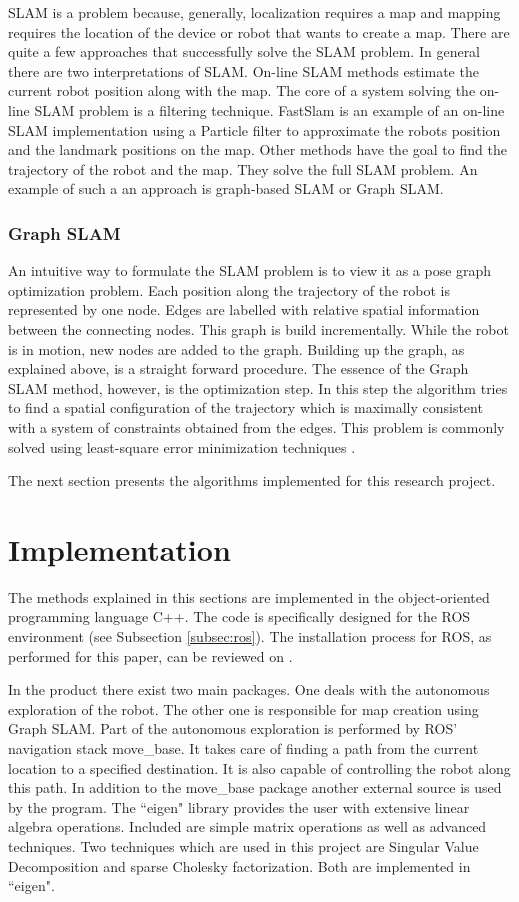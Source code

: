 \documentclass{ba-kecs}
\begin{document}
SLAM is a problem because, generally, localization requires a map and mapping requires the location of the device or robot that wants to create a map. There are quite a few approaches that successfully solve the SLAM problem. In general there are two interpretations of SLAM. On-line SLAM methods estimate the current robot position along with the map. The core of a system solving the on-line SLAM problem is a filtering technique. FastSlam \citep{Montemerlo02} is an example of an on-line SLAM implementation using a Particle filter to approximate the robots position and the landmark positions on the map. Other methods have the goal to find the trajectory of the robot and the map. They solve the full SLAM problem.   
An example of such a an approach is graph-based SLAM or Graph SLAM.

\subsubsection{Graph SLAM}
An intuitive way to formulate the SLAM problem is to view it as a pose graph optimization problem. Each position along the trajectory of the robot is represented by one node. Edges are labelled with relative spatial information between the connecting nodes. This graph is build incrementally. While the robot is in motion, new nodes are added to the graph. Building up the graph, as explained above, is a straight forward procedure. The essence of the Graph SLAM method, however, is the optimization step. In this step the algorithm tries to find a spatial configuration of the trajectory which is maximally consistent with a system of constraints obtained from the edges. This problem is commonly solved using least-square error minimization techniques \citep{Grisetti}.

The next section presents the algorithms implemented for this research project.

\section{Implementation}
\label{sec:impl}

The methods explained in this sections are implemented in the object-oriented programming language C++. The code is specifically designed for the ROS environment (see Subsection \ref{subsec:ros}). The installation process for ROS, as performed for this paper, can be reviewed on \cite{swarmlab}.

In the product there exist two main packages. One deals with the autonomous exploration of the robot. The other one is responsible for map creation using Graph SLAM. Part of the autonomous exploration is performed by ROS' navigation stack move\_base. It takes care of finding a path from the current location to a specified destination. It is also capable of controlling the robot along this path. In addition to the move\_base package another external source is used by the program. The ``eigen" library \citep{eigen} provides the user with extensive linear algebra operations. Included are simple matrix operations as well as advanced techniques. Two techniques which are used in this project are Singular Value Decomposition and sparse Cholesky factorization. Both are implemented in ``eigen".
\end{document}
